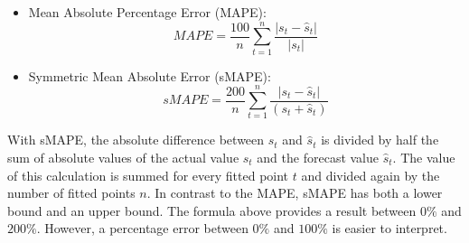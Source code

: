 \begin{itemize}	
	\item Mean Absolute Percentage Error (MAPE):
	\begin{equation}
	MAPE = \frac{100}{n}\sum_{t=1}^{n} \frac{\left|s_t - \hat{s}_t\right|}{|s_t|}
	\end{equation}	
	\item Symmetric Mean Absolute Error (sMAPE):	
	\begin{equation}
	sMAPE = \frac{200}{n}\sum_{t=1}^{n} \frac{\left|s_t - \hat{s}_t\right|}{\left(s_{t}+\hat{s}_{t}\right)}
	\end{equation}	
\end{itemize}

With sMAPE, the absolute difference between $s_{t}$ and $\hat{s}_{t}$ is divided by half the sum of absolute values of the actual value $s_{t}$ and the forecast value $\hat{s}_{t}$. The value of this calculation is summed for every fitted point $t$ and divided again by the number of fitted points $n$. In contrast to the MAPE, sMAPE has both a lower bound and an upper bound. The formula above provides a result between $0\%$ and $200\%$. However, a percentage error between $0\%$ and $100\%$ is easier to interpret.  


% 

